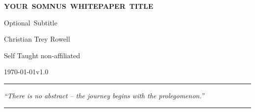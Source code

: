 \documentclass[11pt,letterpaper]{article}
\newcommand{\DocTitle}{Your~Somnus~Whitepaper~Title}
\newcommand{\DocSubtitle}{Optional~Subtitle}
\newcommand{\AuthorList}{Christian Trey Rowell}
\newcommand{\Affiliation}{Self Taught non-affiliated}
\newcommand{\DateStamp}{\today}
\newcommand{\Version}{v1.0}
\begin{document}
\thispagestyle{empty}

\vspace*{2.5in}

{\centering
    {\Huge\bfseries\uppercase{\DocTitle}}\par
    \vspace{0.5em}
    {\Large\DocSubtitle}\par
    \vspace{1.5em}
    {\large\AuthorList\par}
    {\normalsize \Affiliation\par}
    \vspace{1em}
    {\footnotesize \DateStamp\quad \textbullet\quad \Version\par}
}

\vfill

\hrule
\vspace{0.5em}
{\itshape
    ``There is no abstract – the journey begins with the prolegomenon.''
}\par
\vspace{0.5em}
\hrule
\end{document}
